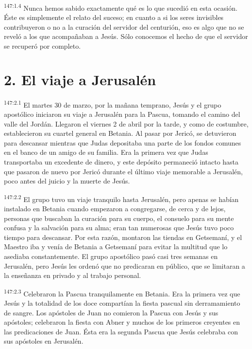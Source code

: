 \par
\textsuperscript{147:1.4} Nunca hemos sabido exactamente qué es lo que sucedió en esta ocasión. Éste es simplemente el relato del suceso; en cuanto a si los seres invisibles contribuyeron o no a la curación del servidor del centurión, eso es algo que no se reveló a los que acompañaban a Jesús. Sólo conocemos el hecho de que el servidor se recuperó por completo.

\section*{2. El viaje a Jerusalén}
\par
\textsuperscript{147:2.1} El martes 30 de marzo, por la mañana temprano, Jesús y el grupo apostólico iniciaron su viaje a Jerusalén para la Pascua, tomando el camino del valle del Jordán. Llegaron el viernes 2 de abril por la tarde, y como de costumbre, establecieron su cuartel general en Betania. Al pasar por Jericó, se detuvieron para descansar mientras que Judas depositaba una parte de los fondos comunes en el banco de un amigo de su familia. Era la primera vez que Judas transportaba un excedente de dinero, y este depósito permaneció intacto hasta que pasaron de nuevo por Jericó durante el último viaje memorable a Jerusalén, poco antes del juicio y la muerte de Jesús.

\par
\textsuperscript{147:2.2} El grupo tuvo un viaje tranquilo hasta Jerusalén, pero apenas se habían instalado en Betania cuando empezaron a congregarse, de cerca y de lejos, personas que buscaban la curación para su cuerpo, el consuelo para su mente confusa y la salvación para su alma; eran tan numerosas que Jesús tuvo poco tiempo para descansar. Por esta razón, montaron las tiendas en Getsemaní, y el Maestro iba y venía de Betania a Getsemaní para evitar la multitud que lo asediaba constantemente. El grupo apostólico pasó casi tres semanas en Jerusalén, pero Jesús les ordenó que no predicaran en público, que se limitaran a la enseñanza en privado y al trabajo personal.

\par
\textsuperscript{147:2.3} Celebraron la Pascua tranquilamente en Betania. Era la primera vez que Jesús y la totalidad de los doce compartían la fiesta pascual sin derramamiento de sangre. Los apóstoles de Juan no comieron la Pascua con Jesús y sus apóstoles; celebraron la fiesta con Abner y muchos de los primeros creyentes en las predicaciones de Juan. Ésta era la segunda Pascua que Jesús celebraba con sus apóstoles en Jerusalén.

